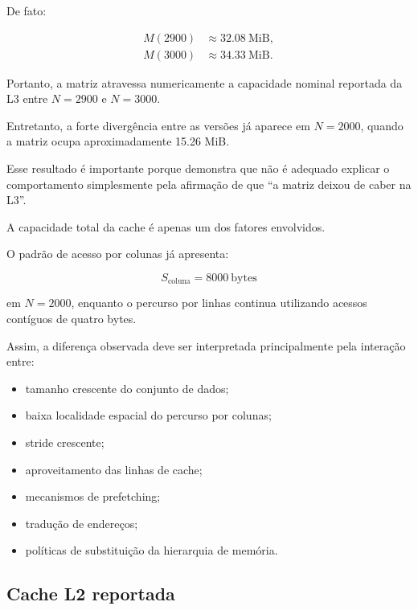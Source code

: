 De fato:

\begin{align}
M(2900)
&\approx
32.08\ \mathrm{MiB},
\\
M(3000)
&\approx
34.33\ \mathrm{MiB}.
\end{align}

Portanto, a matriz atravessa numericamente a capacidade nominal reportada
da L3 entre \(N=2900\) e \(N=3000\).

Entretanto, a forte divergência entre as versões já aparece em
\(N=2000\), quando a matriz ocupa aproximadamente 15.26 MiB.

Esse resultado é importante porque demonstra que não é adequado explicar
o comportamento simplesmente pela afirmação de que ``a matriz deixou de
caber na L3''.

A capacidade total da cache é apenas um dos fatores envolvidos.

O padrão de acesso por colunas já apresenta:

\begin{equation}
    S_{\mathrm{coluna}}
    =
    8000\ \mathrm{bytes}
\end{equation}

em \(N=2000\), enquanto o percurso por linhas continua utilizando acessos
contíguos de quatro bytes.

Assim, a diferença observada deve ser interpretada principalmente pela
interação entre:

\begin{itemize}

    \item tamanho crescente do conjunto de dados;

    \item baixa localidade espacial do percurso por colunas;

    \item stride crescente;

    \item aproveitamento das linhas de cache;

    \item mecanismos de prefetching;

    \item tradução de endereços;

    \item políticas de substituição da hierarquia de memória.

\end{itemize}


\subsection{Cache L2 reportada}

